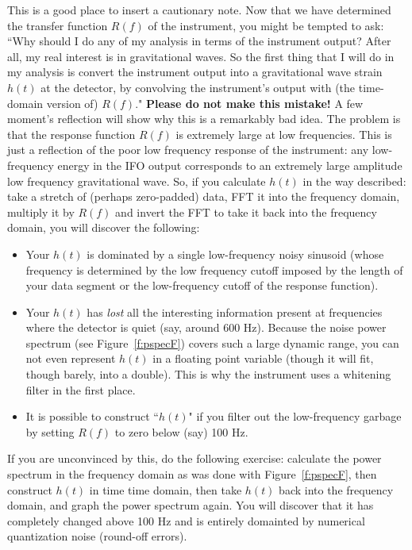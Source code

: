 This is a good place to insert a cautionary note.  Now that we have
determined the transfer function $R(f)$ of the instrument, you might be
tempted to ask: ``Why should I do any of my analysis in terms of the
instrument output?  After all, my real interest is in gravitational
waves.  So the first thing that I will do in my analysis is convert the
instrument output into a gravitational wave strain $h(t)$ at the
detector, by convolving the instrument's output with (the time-domain
version of) $R(f)$."  {\bf Please do not make this mistake!} A few moment's
reflection will show why this is a remarkably bad idea.  The problem
is that the response function $R(f)$ is extremely
large at low frequencies.  This is just a reflection of the poor low
frequency response of the instrument: any low-frequency energy in the
IFO output corresponds to an extremely large amplitude low frequency
gravitational wave.  So, if you calculate $h(t)$ in the way described:
take a stretch of (perhaps zero-padded) data, FFT it into the frequency domain,
multiply it by $R(f)$ and invert the FFT to take it back into the frequency
domain, you will discover the following:
\begin{itemize}
\item
Your $h(t)$ is dominated by a single low-frequency noisy sinusoid
(whose frequency is determined by the low frequency cutoff imposed by
the length of your data segment or the low-frequency cutoff of the
response function).
\item
Your $h(t)$ has {\it lost} all the interesting information present at
frequencies where the detector is quiet (say, around 600 Hz).  Because
the noise power spectrum (see Figure~\ref{f:pspecF}) covers such a large
dynamic range, you can not even represent $h(t)$ in a floating point
variable (though it will fit, though barely, into a double).  This is
why the instrument uses a whitening filter in the first place.
\item
It is possible to construct ``$h(t)$" if you filter out the
low-frequency garbage by setting $R(f)$ to zero below (say) 100 Hz.
\end{itemize}
If you are unconvinced by this, do the following exercise:  calculate
the power spectrum in the frequency domain as was done with
Figure~\ref{f:pspecF}, then construct $h(t)$ in time time domain, then
take $h(t)$ back into the frequency domain, and graph the power
spectrum again.  You will discover that it has completely changed above
100 Hz and is entirely domainted by numerical quantization noise
(round-off errors).

